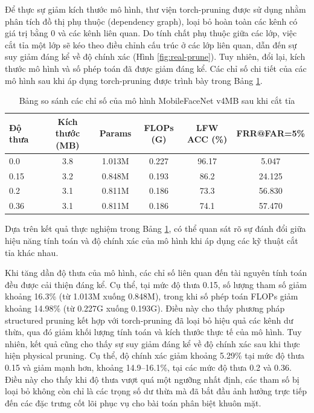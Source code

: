 Để thực sự giảm kích thước mô hình, thư viện torch-pruning\cite{fang2023depgraph} được sử dụng nhằm phân tích đồ thị phụ thuộc (dependency graph), loại bỏ hoàn toàn các kênh có giá trị bằng 0 và các kênh liên quan. Do tính chất phụ thuộc giữa các lớp, việc cắt tỉa một lớp sẽ kéo theo điều chỉnh cấu trúc ở các lớp liên quan, dẫn đến sự suy giảm đáng kể về độ chính xác (Hình \ref{fig:real-prune}). Tuy nhiên, đổi lại, kích thước mô hình và số phép toán đã được giảm đáng kể. Các chỉ số chi tiết của các mô hình sau khi áp dụng torch-pruning được trình bày trong Bảng \ref{tab:prune-table}.

\begin{table}[]
\centering
\small
\begin{tabular}{|l|c|c|c|c|c|}
\hline
\textbf{Độ thưa} & \textbf{Kích thước (MB)} & \textbf{Params} & \textbf{FLOPs (G)} & \textbf{LFW ACC (\%)} & \textbf{FRR@FAR=5\%}\\
\hline
0.0  & 3.8 & 1.013M & 0.227 & 96.17 & 5.047\\
0.15 & 3.2 & 0.848M & 0.193 & 86.2 & 24.125\\
0.2 & 3.1 & 0.811M & 0.186 & 73.3 & 56.830\\
0.36 & 3.1 & 0.811M & 0.186 & 74.1 & 57.470 \\
\hline
\end{tabular}
\caption{Bảng so sánh các chỉ số của mô hình MobileFaceNet v4MB sau khi cắt tỉa}
\label{tab:prune-table}
\end{table}

Dựa trên kết quả thực nghiệm trong Bảng \ref{tab:prune-table}, có thể quan sát rõ sự đánh đổi giữa hiệu năng tính toán và độ chính xác của mô hình khi áp dụng các kỹ thuật cắt tỉa khác nhau.

Khi tăng dần độ thưa của mô hình, các chỉ số liên quan đến tài nguyên tính toán đều được cải thiện đáng kể. Cụ thể, tại mức độ thưa 0.15, số lượng tham số giảm khoảng 16.3\% (từ 1.013M xuống 0.848M), trong khi số phép toán FLOPs giảm khoảng 14.98\% (từ 0.227G xuống 0.193G). Điều này cho thấy phương pháp structured pruning kết hợp với torch-pruning đã loại bỏ hiệu quả các kênh dư thừa, qua đó giảm khối lượng tính toán và kích thước thực tế của mô hình. Tuy nhiên, kết quả cũng cho thấy sự suy giảm đáng kể về độ chính xác sau khi thực hiện physical pruning. Cụ thể, độ chính xác giảm khoảng 5.29\% tại mức độ thưa 0.15 và giảm mạnh hơn, khoảng 14.9–16.1\%, tại các mức độ thưa 0.2 và 0.36. Điều này cho thấy khi độ thưa vượt quá một ngưỡng nhất định, các tham số bị loại bỏ không còn chỉ là các trọng số dư thừa mà đã bắt đầu ảnh hưởng trực tiếp đến các đặc trưng cốt lõi phục vụ cho bài toán phân biệt khuôn mặt.

